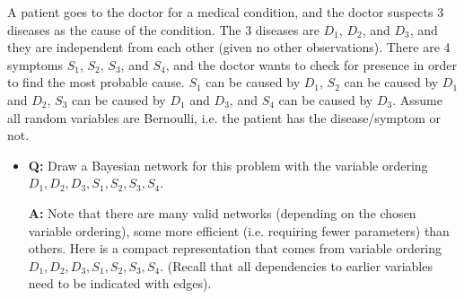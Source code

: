 \documentclass[11pt,letterpaper]{article}
\begin{document}
A patient goes to the doctor for a medical condition, and the doctor
suspects 3 diseases as the cause of the condition. The 3 diseases are
$D_1$, $D_2$, and $D_3$, and they are independent from each other
(given no other observations). There are 4 symptoms $S_1$, $S_2$,
$S_3$, and $S_4$, and the doctor wants to check for presence in order
to find the most probable cause.  $S_1$ can be caused by $D_1$, $S_2$
can be caused by $D_1$ and $D_2$, $S_3$ can be caused by $D_1$ and
$D_3$, and $S_4$ can be caused by $D_3$. Assume all random variables
are Bernoulli, i.e. the patient has the disease/symptom or not.
%
\begin{itemize}
\item \textbf{Q:} Draw a Bayesian network for this problem with the variable ordering  $D_1, D_2, D_3, S_1, S_2, S_3, S_4$. 

\begin{solution}
\textbf{A:} Note that there are many valid networks (depending on the chosen variable ordering), 
some more efficient (i.e. requiring fewer parameters) than others. Here is a 
compact representation that comes from variable ordering $D_1, D_2, D_3, S_1, S_2, S_3, S_4$. (Recall that 
all dependencies to earlier variables need to be indicated with edges).
%
\begin{figure}[htp]
\begin{center}
\end{center}
\end{figure}

\end{solution}


\end{itemize}
\end{document}
